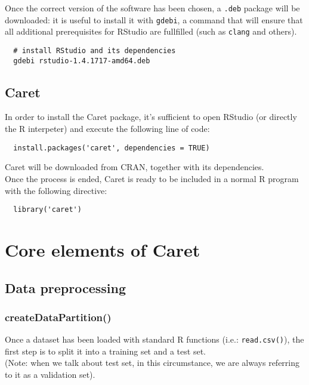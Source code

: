\documentclass{article}
\begin{document}
Once the correct version of the software has been chosen, a \texttt{.deb} package will be downloaded: it is useful to install it with \texttt{gdebi}, a command that will ensure that all additional prerequisites for RStudio are fullfilled (such as \texttt{clang} and others).\\

\begin{lstlisting}
  # install RStudio and its dependencies
  gdebi rstudio-1.4.1717-amd64.deb
\end{lstlisting}

\pagebreak

\subsection{Caret}
In order to install the Caret package, it's sufficient to open RStudio (or directly the R interpeter) and execute the following line of code:\\

\begin{lstlisting}
  install.packages('caret', dependencies = TRUE)
\end{lstlisting}

Caret will be downloaded from CRAN, together with its dependencies.\\

Once the process is ended, Caret is ready to be included in a normal R program with the following directive:\\

\begin{lstlisting}
  library('caret')
\end{lstlisting}

\pagebreak

\section{Core elements of Caret}
\subsection{Data preprocessing}
\subsubsection{createDataPartition()}
Once a dataset has been loaded with standard R functions (i.e.: \texttt{read.csv()}), the first step is to split it into a training set and a test set.\\
(Note: when we talk about test set, in this circumstance, we are always referring to it as a validation set).\\
\end{document}
